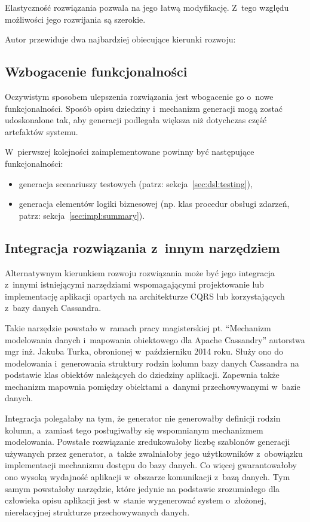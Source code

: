 Elastyczność rozwiązania pozwala na jego łatwą modyfikację.
Z~tego względu możliwości jego rozwijania są szerokie.

Autor przewiduje dwa najbardziej obiecujące kierunki rozwoju:


\subsection{Wzbogacenie funkcjonalności}

Oczywistym sposobem ulepszenia rozwiązania jest wbogacenie go o~nowe funkcjonalności.
Sposób opisu dziedziny i~mechanizm generacji mogą zostać udoskonalone tak, aby generacji podlegała większa niż dotychczas część artefaktów systemu.

W~pierwszej kolejności zaimplementowane powinny być następujące funkcjonalności:

\begin{itemize}
 \item generacja scenariuszy testowych (patrz: sekcja~\ref{sec:dsl:testing}),
 \item generacja elementów logiki biznesowej (np. klas procedur obsługi zdarzeń, patrz: sekcja~\ref{sec:impl:summary}).
\end{itemize}


\subsection{Integracja rozwiązania z~innym narzędziem}

Alternatywnym kierunkiem rozwoju rozwiązania może być jego integracja z~innymi istniejącymi narzędziami wspomagającymi projektowanie lub implementację aplikacji opartych na architekturze CQRS lub korzystających z~bazy danych Cassandra.

Takie narzędzie powstało w~ramach pracy magisterskiej pt. ``Mechanizm modelowania danych i~mapowania obiektowego dla Apache Cassandry'' autorstwa mgr inż. Jakuba Turka, obronionej w~październiku 2014 roku.
Służy ono do modelowania i~generowania struktury rodzin kolumn bazy danych Cassandra na podstawie klas obiektów należących do dziedziny aplikacji.
Zapewnia także mechanizm mapownia pomiędzy obiektami a~danymi przechowywanymi w~bazie danych.

Integracja polegałaby na tym, że generator nie generowałby definicji rodzin kolumn, a~zamiast tego posługiwałby się wspomnianym mechanizmem modelowania.
Powstałe rozwiązanie zredukowałoby liczbę szablonów generacji używanych przez generator, a~także zwalniałoby jego użytkowników z~obowiązku implementacji mechanizmu dostępu do bazy danych.
Co więcej gwarantowałoby ono wysoką wydajność aplikacji w~obszarze komunikacji z~bazą danych.
Tym samym powstałoby narzędzie, które jedynie na podstawie zrozumiałego dla człowieka opisu aplikacji jest w~stanie wygenerować system o~złożonej, nierelacyjnej strukturze przechowywanych danych.



